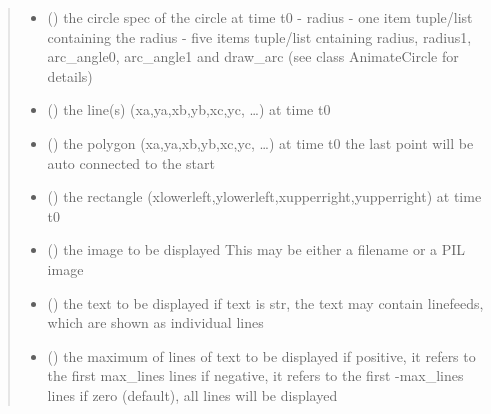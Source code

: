 \documentclass[letterpaper,10pt,english]{sphinxmanual}
\begin{document}
\begin{fulllineitems}
\begin{quote}
\begin{description}
\begin{itemize}
\item {} 
 () \textendash{} the circle spec of the circle at time t0 
- radius 
- one item tuple/list containing the radius 
- five items tuple/list cntaining radius, radius1, arc\_angle0, arc\_angle1 and draw\_arc
(see class AnimateCircle for details)

\item {} 
 () \textendash{} the line(s) (xa,ya,xb,yb,xc,yc, …) at time t0

\item {} 
 () \textendash{} the polygon (xa,ya,xb,yb,xc,yc, …) at time t0 
the last point will be auto connected to the start

\item {} 
 () \textendash{} the rectangle (xlowerleft,ylowerleft,xupperright,yupperright) at time t0 

\item {} 
 () \textendash{} the image to be displayed 
This may be either a filename or a PIL image

\item {} 
 (\sphinxstyleliteralemphasis{\sphinxupquote{, }}) \textendash{} the text to be displayed 
if text is str, the text may contain linefeeds, which are shown as individual lines

\item {} 
 () \textendash{} the maximum of lines of text to be displayed 
if positive, it refers to the first max\_lines lines 
if negative, it refers to the first -max\_lines lines 
if zero (default), all lines will be displayed


\end{itemize}
\end{description}
\end{quote}
\end{fulllineitems}
\end{document}
